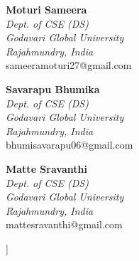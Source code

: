 \documentclass[10pt,twocolumn,a4paper]{article}
\begin{document}
{\begin{center}
    \begin{minipage}[t]{0.31\textwidth}
      \centering
      \textbf{Moturi Sameera}\\
      \textit{Dept. of CSE (DS)}\\
      \textit{Godavari Global University}\\
      \textit{Rajahmundry, India}\\
      sameeramoturi27@gmail.com
    \end{minipage}
    \hfill
    \begin{minipage}[t]{0.31\textwidth}
      \centering
      \textbf{Savarapu Bhumika}\\
      \textit{Dept. of CSE (DS)}\\
      \textit{Godavari Global University}\\
      \textit{Rajahmundry, India}\\
      bhumisavarapu06@gmail.com
    \end{minipage}
    \hfill
    \begin{minipage}[t]{0.31\textwidth}
      \centering
      \textbf{Matte Sravanthi}\\
      \textit{Dept. of CSE (DS)}\\
      \textit{Godavari Global University}\\
      \textit{Rajahmundry, India}\\
      mattesravanthi@gmail.com
    \end{minipage}
    \vspace{0.6em}
  \end{center}
}]
\end{document}
